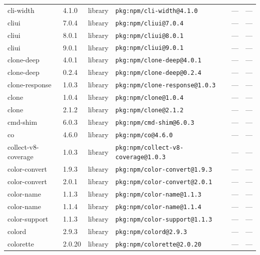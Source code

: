 \documentclass[11pt,a4paper]{article}
\begin{document}
\begin{longtable}{|p{4cm}|p{2cm}|p{1.6cm}|p{5cm}|p{1.5cm}|p{3.5cm}|}
\raggedright cli-width & 4.1.0 & library & \small\texttt{pkg:npm/cli-width@4.1.0} & — & \small — \\
\raggedright cliui & 7.0.4 & library & \small\texttt{pkg:npm/cliui@7.0.4} & — & \small — \\
\raggedright cliui & 8.0.1 & library & \small\texttt{pkg:npm/cliui@8.0.1} & — & \small — \\
\raggedright cliui & 9.0.1 & library & \small\texttt{pkg:npm/cliui@9.0.1} & — & \small — \\
\raggedright clone-deep & 4.0.1 & library & \small\texttt{pkg:npm/clone-deep@4.0.1} & — & \small — \\
\raggedright clone-deep & 0.2.4 & library & \small\texttt{pkg:npm/clone-deep@0.2.4} & — & \small — \\
\raggedright clone-response & 1.0.3 & library & \small\texttt{pkg:npm/clone-response@1.0.3} & — & \small — \\
\raggedright clone & 1.0.4 & library & \small\texttt{pkg:npm/clone@1.0.4} & — & \small — \\
\raggedright clone & 2.1.2 & library & \small\texttt{pkg:npm/clone@2.1.2} & — & \small — \\
\raggedright cmd-shim & 6.0.3 & library & \small\texttt{pkg:npm/cmd-shim@6.0.3} & — & \small — \\
\raggedright co & 4.6.0 & library & \small\texttt{pkg:npm/co@4.6.0} & — & \small — \\
\raggedright collect-v8-coverage & 1.0.3 & library & \small\texttt{pkg:npm/collect-v8-coverage@1.0.3} & — & \small — \\
\raggedright color-convert & 1.9.3 & library & \small\texttt{pkg:npm/color-convert@1.9.3} & — & \small — \\
\raggedright color-convert & 2.0.1 & library & \small\texttt{pkg:npm/color-convert@2.0.1} & — & \small — \\
\raggedright color-name & 1.1.3 & library & \small\texttt{pkg:npm/color-name@1.1.3} & — & \small — \\
\raggedright color-name & 1.1.4 & library & \small\texttt{pkg:npm/color-name@1.1.4} & — & \small — \\
\raggedright color-support & 1.1.3 & library & \small\texttt{pkg:npm/color-support@1.1.3} & — & \small — \\
\raggedright colord & 2.9.3 & library & \small\texttt{pkg:npm/colord@2.9.3} & — & \small — \\
\raggedright colorette & 2.0.20 & library & \small\texttt{pkg:npm/colorette@2.0.20} & — & \small — \\

\end{longtable}
\end{document}
